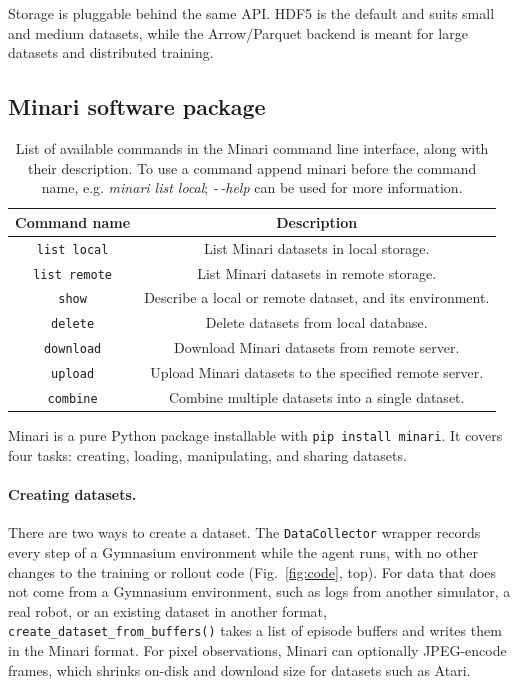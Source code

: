 \documentclass{article}
\newcommand\bashstyle{\lstset{
language=bash,
basicstyle=\ttm,
morekeywords={},              %
keywordstyle=\ttm,%
emph={},          %
emphstyle=\ttb\color{deepred},    %
stringstyle=\color{deepgreen},
frame=tb,                         %
showstringspaces=false
}}
\newcommand\bashinline[1]{{\bashstyle\lstinline!#1!}}
\begin{document}
Storage is pluggable behind the same API. HDF5 is the default and suits small and medium datasets, while the Arrow/Parquet backend is meant for large datasets and distributed training.

\subsection{Minari software package}
\begin{table}[]
    \centering
    \begin{tabular}{cc}
    \toprule
    \textbf{Command name} & \textbf{Description}\\
    \midrule
     \bashinline{list local} & List Minari datasets in local storage. \\
     \bashinline{list remote} & List Minari datasets in remote storage. \\
     \bashinline{show} & Describe a local or remote dataset, and its environment. \\
     \bashinline{delete} & Delete datasets from local database. \\
     \bashinline{download} & Download Minari datasets from remote server.\\
     \bashinline{upload} & Upload Minari datasets to the specified remote server. \\
     \bashinline{combine} & Combine multiple datasets into a single dataset.\\
     \bottomrule
    \end{tabular}
    \caption{List of available commands in the Minari command line interface, along with their description. To use a command append minari before the command name, e.g. \textit{minari list local}; \textit{-\,-help} can be used for more information.}
    \label{tab:cli}
\end{table}

Minari is a pure Python package installable with \verb|pip install minari|. It covers four tasks: creating, loading, manipulating, and sharing datasets.

\paragraph{Creating datasets.} There are two ways to create a dataset. The \verb|DataCollector| wrapper records every step of a Gymnasium environment while the agent runs, with no other changes to the training or rollout code (Fig.~\ref{fig:code}, top). For data that does not come from a Gymnasium environment, such as logs from another simulator, a real robot, or an existing dataset in another format, \verb|create_dataset_from_buffers()| takes a list of episode buffers and writes them in the Minari format. For pixel observations, Minari can optionally JPEG-encode frames, which shrinks on-disk and download size for datasets such as Atari.
\end{document}
